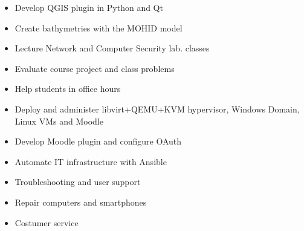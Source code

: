 \documentclass[10pt,a4paper,ragged2e,withhyper]{altacv}
\begin{document}
\begin{paracol}{2}

\begin{itemize}
\item Develop QGIS plugin in Python and Qt
\item Create bathymetries with the MOHID model
\end{itemize}
\divider

\begin{itemize}
\item Lecture Network and Computer Security lab. classes
\item Evaluate course project and class problems
\item Help students in office hours
\end{itemize}
\divider

\begin{itemize}
\item Deploy and administer libvirt+QEMU+KVM hypervisor, Windows Domain, Linux VMs and Moodle
\item Develop Moodle plugin and configure OAuth
\item Automate IT infrastructure with Ansible
\item Troubleshooting and user support
\end{itemize}
\divider

\begin{itemize}
\item Repair computers and smartphones
\item Costumer service
\end{itemize}


\end{paracol}
\end{document}
